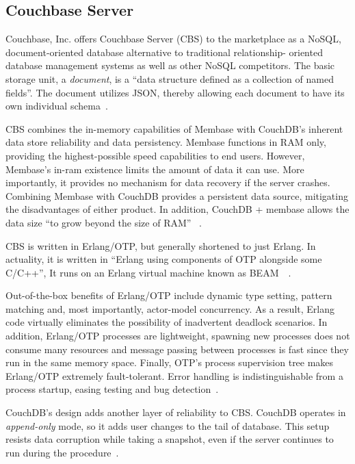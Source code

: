      \pv

\subsection{Couchbase Server}


Couchbase, Inc. offers Couchbase Server (CBS) to the marketplace as a
NoSQL, document-oriented database alternative to traditional
relationship- oriented database management systems as well as other
NoSQL competitors.  The basic storage unit, a \textit{document}, is a ``data
structure defined as a collection of named fields''.  The document
utilizes JSON, thereby allowing each document to have its own
individual schema~\cite{www-infoworld-cbs}.

CBS combines the in-memory capabilities of Membase with CouchDB's
inherent data store reliability and data persistency.  Membase
functions in RAM only, providing the highest-possible speed
capabilities to end users.  However, Membase's in-ram existence limits
the amount of data it can use.  More importantly, it provides no
mechanism for data recovery if the server crashes.  Combining Membase
with CouchDB provides a persistent data source, mitigating the
disadvantages of either product.  In addition, CouchDB + membase
allows the data size ``to grow beyond the size of RAM''
~\cite{www-safaribooks-cbs}.

CBS is written in Erlang/OTP, but generally shortened to just Erlang.
In actuality, it is written in ``Erlang using components of OTP
alongside some C/C++'', It runs on an Erlang virtual machine known as
BEAM~\cite{www-wikipedia-erlang-cbs}~\cite{www-erlangcentral-cbs}.

Out-of-the-box benefits of Erlang/OTP include dynamic type setting,
pattern matching and, most importantly, actor-model concurrency.  As a
result, Erlang code virtually eliminates the possibility of
inadvertent deadlock scenarios.  In addition, Erlang/OTP processes are
lightweight, spawning new processes does not consume many resources
and message passing between processes is fast since they run in the
same memory space.  Finally, OTP's process supervision tree makes
Erlang/OTP extremely fault-tolerant.  Error handling is
indistinguishable from a process startup, easing testing and bug
detection~\cite{www-couchbase-blog-cbs}.

CouchDB's design adds another layer of reliability to CBS.  CouchDB
operates in \textit{append-only} mode, so it adds user changes to the tail of
database.  This setup resists data corruption while taking a snapshot,
even if the server continues to run during the
procedure~\cite{www-hightower-cbs}.

